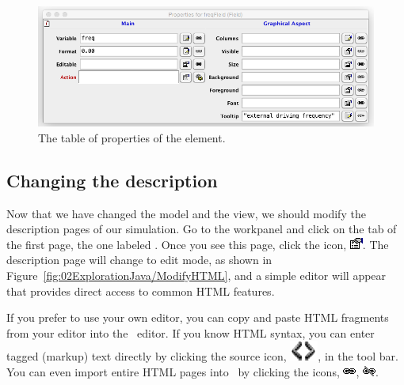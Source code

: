 \begin{figure}[htb]
    \centering
  \includegraphics[scale=\scale]{02ExplorationJava/images/ModifyField.png}
    \caption{The table of properties of the  element.}
    \label{fig:02ExplorationJava/ModifyField}
\end{figure}

\subsection{Changing the description}\label{section:02ExplorationJavaModifyingDescription}

Now that we have changed the model and the view, we should modify the description pages of our simulation. Go to the  workpanel and click on the tab of the first page, the one labeled . Once you see this page, click the  icon, \includegraphics[scale=\linescale]{../_common/icons_png/edit.png}. The description page will change to edit mode, as shown in Figure~\ref{fig:02ExplorationJava/ModifyHTML}, and a simple editor will appear that provides direct access to common HTML features.

If you prefer to use your own editor, you can copy and paste HTML fragments from your editor into the \ejs\ editor. If you know HTML syntax, you can enter tagged (markup) text directly by clicking the source icon, \includegraphics[scale=\linescale]{02ExplorationJava/images/SourceHK.png}, in the tool bar.  You can even import entire HTML pages into \ejs\ by clicking the  icons, \includegraphics[scale=\linescale]{../_common/icons_png/link.png}, \includegraphics[scale=\linescale]{../_common/icons_png/unlinked.png}.

